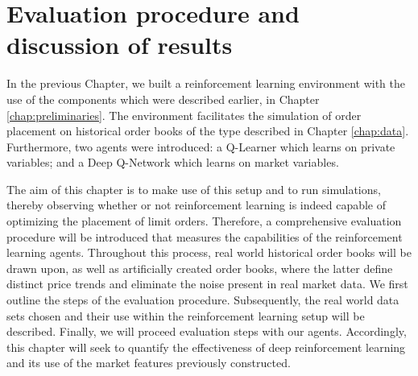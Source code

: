 \chapter{Evaluation procedure and discussion of results}
\label{chap:analysis}

In the previous Chapter, we built a reinforcement learning environment with the use of the components which were described earlier, in Chapter \ref{chap:preliminaries}.
The environment facilitates the simulation of order placement on historical order books of the type described in Chapter \ref{chap:data}.
Furthermore, two agents were introduced: a Q-Learner which learns on private variables; and a Deep Q-Network which learns on market variables.

The aim of this chapter is to make use of this setup and to run simulations, thereby observing whether or not reinforcement learning is indeed capable of optimizing the placement of limit orders.
Therefore, a comprehensive evaluation procedure will be introduced that  measures the capabilities of the reinforcement learning agents.
Throughout this process, real world historical order books will be drawn upon, as well as artificially created order books, where the latter define distinct price trends and eliminate the noise present in real market data.
We first outline the steps of the evaluation procedure.
Subsequently, the real world data sets chosen and their use within the reinforcement learning setup will be described.
Finally, we will proceed evaluation steps with our agents.
Accordingly, this chapter will seek to quantify the effectiveness of deep reinforcement learning and its use of the market features previously constructed.

